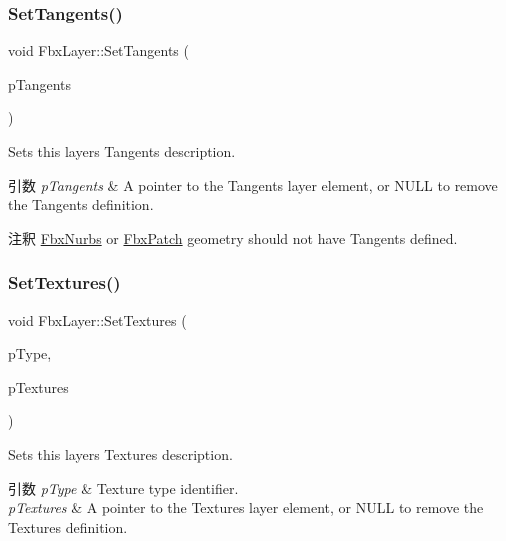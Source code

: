 \subsubsection{\texorpdfstring{Set\+Tangents()}{SetTangents()}}
{\footnotesize\ttfamily void Fbx\+Layer\+::\+Set\+Tangents (\begin{DoxyParamCaption}\item[{\hyperlink{class_fbx_layer_element_tangent}{Fbx\+Layer\+Element\+Tangent} $\ast$}]{p\+Tangents }\end{DoxyParamCaption})}

Sets this layer\textquotesingle{}s Tangents description. 
\begin{DoxyParams}{引数}
{\em p\+Tangents} & A pointer to the Tangents layer element, or {\ttfamily N\+U\+LL} to remove the Tangents definition. \\
\hline
\end{DoxyParams}
\begin{DoxyRemark}{注釈}
\hyperlink{class_fbx_nurbs}{Fbx\+Nurbs} or \hyperlink{class_fbx_patch}{Fbx\+Patch} geometry should not have Tangents defined. 
\end{DoxyRemark}
\mbox{\label{class_fbx_layer_ad18cd7d4f5591c16f4a0f230b91a19e3}} 
\subsubsection{\texorpdfstring{Set\+Textures()}{SetTextures()}}
{\footnotesize\ttfamily void Fbx\+Layer\+::\+Set\+Textures (\begin{DoxyParamCaption}\item[{\hyperlink{class_fbx_layer_element_a8c95c5cd880b56c776acd379bd86f42c}{Fbx\+Layer\+Element\+::\+E\+Type}}]{p\+Type,  }\item[{\hyperlink{class_fbx_layer_element_texture}{Fbx\+Layer\+Element\+Texture} $\ast$}]{p\+Textures }\end{DoxyParamCaption})}

Sets this layer\textquotesingle{}s Textures description. 
\begin{DoxyParams}{引数}
{\em p\+Type} & Texture type identifier. \\
\hline
{\em p\+Textures} & A pointer to the Textures layer element, or {\ttfamily N\+U\+LL} to remove the Textures definition. \\
\hline
\end{DoxyParams}
\mbox{\label{class_fbx_layer_a5a3f5e9ed349cf6bfe70801bf7452005}} 
